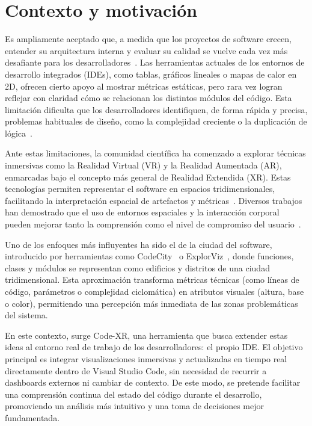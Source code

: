 \documentclass[a4paper, 12pt]{book}
\begin{document}
\section{Contexto y motivación}
\label{sec:contexto}

Es ampliamente aceptado que, a medida que los proyectos de software crecen, entender su arquitectura interna y evaluar su calidad se vuelve cada vez más desafiante para los desarrolladores~\cite{koschke2003software}. Las herramientas actuales de los entornos de desarrollo integrados (IDEs), como tablas, gráficos lineales o mapas de calor en 2D, ofrecen cierto apoyo al mostrar métricas estáticas, pero rara vez logran reflejar con claridad cómo se relacionan los distintos módulos del código. Esta limitación dificulta que los desarrolladores identifiquen, de forma rápida y precisa, problemas habituales de diseño, como la complejidad creciente o la duplicación de lógica~\cite{ball1996software,meyer2008seven}.

Ante estas limitaciones, la comunidad científica ha comenzado a explorar técnicas inmersivas como la Realidad Virtual (VR) y la Realidad Aumentada (AR), enmarcadas bajo el concepto más general de Realidad Extendida (XR). Estas tecnologías permiten representar el software en espacios tridimensionales, facilitando la interpretación espacial de artefactos y métricas~\cite{demiralp2006cave}. Diversos trabajos han demostrado que el uso de entornos espaciales y la interacción corporal pueden mejorar tanto la comprensión como el nivel de compromiso del usuario~\cite{batch2019there}.

Uno de los enfoques más influyentes ha sido el de la ciudad del software, introducido por herramientas como CodeCity~\cite{wettel2007visualizing} o ExplorViz~\cite{fittkau2015exploring}, donde funciones, clases y módulos se representan como edificios y distritos de una ciudad tridimensional. Esta aproximación transforma métricas técnicas (como líneas de código, parámetros o complejidad ciclomática) en atributos visuales (altura, base o color), permitiendo una percepción más inmediata de las zonas problemáticas del sistema.

En este contexto, surge Code-XR, una herramienta que busca extender estas ideas al entorno real de trabajo de los desarrolladores: el propio IDE. El objetivo principal es integrar visualizaciones inmersivas y actualizadas en tiempo real directamente dentro de Visual Studio Code, sin necesidad de recurrir a dashboards externos ni cambiar de contexto. De este modo, se pretende facilitar una comprensión continua del estado del código durante el desarrollo, promoviendo un análisis más intuitivo y una toma de decisiones mejor fundamentada.
\end{document}
